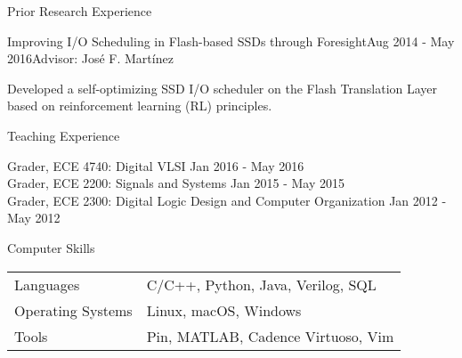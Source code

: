 \documentclass{resume} %
\begin{document}
\newpage


\begin{rSection}{Prior Research Experience}

\begin{rSubsection}{Improving I/O Scheduling in Flash-based SSDs through Foresight}{Aug 2014 - May 2016}{Advisor: José F. Martínez}

\item Developed a self-optimizing SSD I/O scheduler on the Flash Translation Layer based on reinforcement learning (RL) principles. 
\end{rSubsection}

\end{rSection}


\begin{rSection}{Teaching Experience}

Grader, ECE 4740: Digital VLSI \hfill {Jan 2016 - May 2016} \\
Grader, ECE 2200: Signals and Systems \hfill {Jan 2015 - May 2015} \\
Grader, ECE 2300: Digital Logic Design and Computer Organization \hfill{Jan 2012 - May 2012}

\end{rSection}


\begin{rSection}{Computer Skills}

\begin{tabular}{ll}
Languages & C/C++, Python, Java, Verilog, SQL \\
Operating Systems & Linux, macOS, Windows \\
Tools     & Pin, MATLAB, Cadence Virtuoso, Vim \\
\end{tabular}

\end{rSection}






\end{document}
